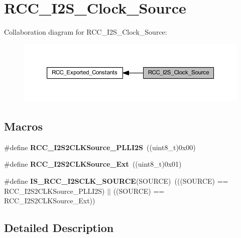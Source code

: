 \hypertarget{group___r_c_c___i2_s___clock___source}{}\section{R\+C\+C\+\_\+\+I2\+S\+\_\+\+Clock\+\_\+\+Source}
\label{group___r_c_c___i2_s___clock___source}
Collaboration diagram for R\+C\+C\+\_\+\+I2\+S\+\_\+\+Clock\+\_\+\+Source\+:
\nopagebreak
\begin{figure}[H]
\begin{center}
\leavevmode
\includegraphics[width=350pt]{group___r_c_c___i2_s___clock___source}
\end{center}
\end{figure}
\subsection*{Macros}
\begin{DoxyCompactItemize}
\item 
\mbox{\label{group___r_c_c___i2_s___clock___source_gae26cc973323877114a509a0108d0a08a}} 
\#define {\bfseries R\+C\+C\+\_\+\+I2\+S2\+C\+L\+K\+Source\+\_\+\+P\+L\+L\+I2S}~((uint8\+\_\+t)0x00)
\item 
\mbox{\label{group___r_c_c___i2_s___clock___source_gaaed7a69a9f2c18645ef6aacd2135c750}} 
\#define {\bfseries R\+C\+C\+\_\+\+I2\+S2\+C\+L\+K\+Source\+\_\+\+Ext}~((uint8\+\_\+t)0x01)
\item 
\mbox{\label{group___r_c_c___i2_s___clock___source_gaa1bd931fa367969adeec7ba154ef7beb}} 
\#define {\bfseries I\+S\+\_\+\+R\+C\+C\+\_\+\+I2\+S\+C\+L\+K\+\_\+\+S\+O\+U\+R\+CE}(S\+O\+U\+R\+CE)~(((S\+O\+U\+R\+CE) == R\+C\+C\+\_\+\+I2\+S2\+C\+L\+K\+Source\+\_\+\+P\+L\+L\+I2S) $\vert$$\vert$ ((S\+O\+U\+R\+CE) == R\+C\+C\+\_\+\+I2\+S2\+C\+L\+K\+Source\+\_\+\+Ext))
\end{DoxyCompactItemize}


\subsection{Detailed Description}
